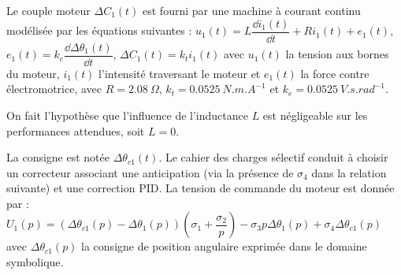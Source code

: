 Le couple moteur $\Delta C_1(t)$ est fourni par une machine à courant continu modélisée par les équations suivantes : 
$u_1(t)=L\dfrac{\dd i_1(t)}{\dd t}  + Ri_1(t)+e_1(t)$, $e_1(t)=k_e \dfrac{\dd \Delta \theta_1(t)}{\dd t}$, $\Delta C_1(t) = k_t i_1(t)$ avec $u_1(t)$ la tension aux bornes du moteur, $i_1(t)$ l’intensité traversant le moteur et $e_1(t)$ la force contre
électromotrice, avec $R=\SI{2,08}{\Omega}$, $k_t = \SI{0,0525}{N.m.A^{-1}}$ et $k_e = \SI{0,0525}{V.s.rad^{-1}}$.

On fait l’hypothèse que l’influence de l’inductance $L$ est négligeable sur les performances attendues, soit $L=0$.

La consigne est notée $\Delta \theta _{c1}(t)$. Le cahier des charges sélectif conduit à choisir un correcteur associant une anticipation (via la présence de $\sigma_4$ dans la relation suivante) et une correction PID. La tension de commande du moteur est donnée par : $U_1(p)=\left( \Delta \theta_{c1}(p)-\Delta \theta_1(p)\right) \left(\sigma_1 + \dfrac{\sigma_2}{p}\right)- \sigma_3p \Delta \theta_1(p)+\sigma_4\Delta \theta_{c1}(p)$
avec $\Delta \theta_{c1}(p)$ la consigne de position angulaire exprimée dans le domaine symbolique.
\fi


